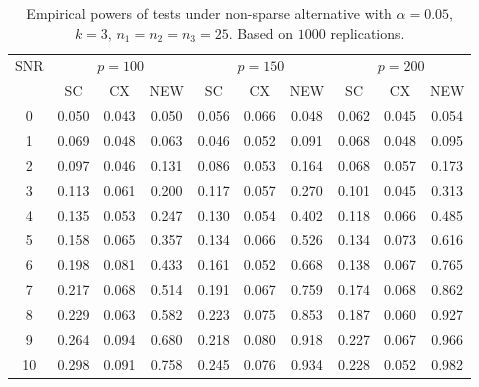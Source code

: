 \documentclass[review]{elsarticle}
\theoremstyle{plain}
\theoremstyle{definition}
\theoremstyle{remark}
\begin{document}
\begin{table}[!hbp]
    \caption{Empirical powers of tests under non-sparse alternative with $\alpha=0.05$, $k=3$, $n_1=n_2=n_3=25$. Based on $1000$ replications.}
\centering
\begin{tabular}{*{10}{c}}
\toprule
\multirow{2}{*}{SNR} &\multicolumn{3}{c}{$p=100$}&\multicolumn{3}{c}{$p=150$}&\multicolumn{3}{c}{$p=200$} \\
    \cmidrule(r){2-4}\cmidrule(r){5-7}\cmidrule(r){8-10}
    &SC & CX & NEW& SC & CX & NEW &SC & CX & NEW\\
\midrule
0 & 0.050 & 0.043 & 0.050 & 0.056 & 0.066 & 0.048 & 0.062 & 0.045 & 0.054 \\ 
1 & 0.069 & 0.048 & 0.063 & 0.046 & 0.052 & 0.091 & 0.068 & 0.048 & 0.095 \\ 
2 & 0.097 & 0.046 & 0.131 & 0.086 & 0.053 & 0.164 & 0.068 & 0.057 & 0.173 \\ 
3 & 0.113 & 0.061 & 0.200 & 0.117 & 0.057 & 0.270 & 0.101 & 0.045 & 0.313 \\ 
4 & 0.135 & 0.053 & 0.247 & 0.130 & 0.054 & 0.402 & 0.118 & 0.066 & 0.485 \\ 
5 & 0.158 & 0.065 & 0.357 & 0.134 & 0.066 & 0.526 & 0.134 & 0.073 & 0.616 \\ 
6 & 0.198 & 0.081 & 0.433 & 0.161 & 0.052 & 0.668 & 0.138 & 0.067 & 0.765 \\ 
7 & 0.217 & 0.068 & 0.514 & 0.191 & 0.067 & 0.759 & 0.174 & 0.068 & 0.862 \\ 
8 & 0.229 & 0.063 & 0.582 & 0.223 & 0.075 & 0.853 & 0.187 & 0.060 & 0.927 \\ 
9 & 0.264 & 0.094 & 0.680 & 0.218 & 0.080 & 0.918 & 0.227 & 0.067 & 0.966 \\ 
10 & 0.298 & 0.091 & 0.758 & 0.245 & 0.076 & 0.934 & 0.228 & 0.052 & 0.982 \\ 
\bottomrule
\end{tabular}
\end{table}
\end{document}

